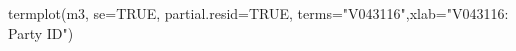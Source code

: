 \begin{Schunk}
\begin{Sinput}
 termplot(m3, se=TRUE, partial.resid=TRUE, terms="V043116",xlab="V043116: Party ID")
\end{Sinput}
\end{Schunk}
